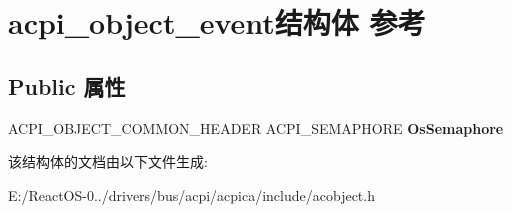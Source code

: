 \hypertarget{structacpi__object__event}{}\section{acpi\+\_\+object\+\_\+event结构体 参考}
\label{structacpi__object__event}
\subsection*{Public 属性}
\begin{DoxyCompactItemize}
\item 
\mbox{\label{structacpi__object__event_a6224136e1c335c48927033c39251f672}} 
A\+C\+P\+I\+\_\+\+O\+B\+J\+E\+C\+T\+\_\+\+C\+O\+M\+M\+O\+N\+\_\+\+H\+E\+A\+D\+ER A\+C\+P\+I\+\_\+\+S\+E\+M\+A\+P\+H\+O\+RE {\bfseries Os\+Semaphore}
\end{DoxyCompactItemize}


该结构体的文档由以下文件生成\+:\begin{DoxyCompactItemize}
\item 
E\+:/\+React\+O\+S-\/0../drivers/bus/acpi/acpica/include/acobject.\+h\end{DoxyCompactItemize}
